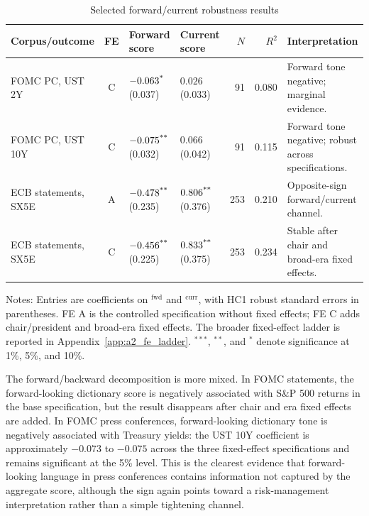 \begin{table}[H]
\centering
\caption{Selected forward/current robustness results}
\label{tab:fe_forward_current_selected_v31}
\begin{threeparttable}
\scriptsize
\setlength{\tabcolsep}{3pt}
\renewcommand{\arraystretch}{1.12}
\begin{tabularx}{\textwidth}{@{}p{2.55cm}c>{\raggedleft\arraybackslash}p{1.85cm}>{\raggedleft\arraybackslash}p{1.85cm}rrX@{}}
\toprule
Corpus/outcome & FE & Forward score & Current score & $N$ & $R^2$ & Interpretation \\
\midrule
FOMC PC, UST 2Y
  & C & $-0.063^{\text{*}}$ (0.037) & $0.026$ (0.033) & 91 & 0.080
  & Forward tone negative; marginal evidence. \\
FOMC PC, UST 10Y
  & C & $-0.075^{\text{**}}$ (0.032) & $0.066$ (0.042) & 91 & 0.115
  & Forward tone negative; robust across specifications. \\
ECB statements, SX5E
  & A & $-0.478^{\text{**}}$ (0.235) & $0.806^{\text{**}}$ (0.376) & 253 & 0.210
  & Opposite-sign forward/current channel. \\
ECB statements, SX5E
  & C & $-0.456^{\text{**}}$ (0.225) & $0.833^{\text{**}}$ (0.375) & 253 & 0.234
  & Stable after chair and broad-era fixed effects. \\
\bottomrule
\end{tabularx}
\begin{tablenotes}[flushleft]
\footnotesize
\item Notes: Entries are coefficients on \netscore{}$^{\text{fwd}}$ and
\netscore{}$^{\text{curr}}$, with HC1 robust standard errors in parentheses.
FE A is the controlled specification without fixed effects; FE C adds
chair/president and broad-era fixed effects. The broader fixed-effect ladder is
reported in Appendix~\ref{app:a2_fe_ladder}. $^{***}$, $^{**}$, and $^{*}$
denote significance at 1\%, 5\%, and 10\%.
\end{tablenotes}
\end{threeparttable}
\end{table}

The forward/backward decomposition is more mixed. In FOMC statements, the
forward-looking dictionary score is negatively associated with S\&P 500
returns in the base specification, but the result disappears after chair and
era fixed effects are added. In FOMC press conferences, forward-looking
dictionary tone is negatively associated with Treasury yields: the UST 10Y
coefficient is approximately $-0.073$ to $-0.075$ across the three
fixed-effect specifications and remains significant at the 5\% level. This is
the clearest evidence that forward-looking language in press conferences
contains information not captured by the aggregate score, although the sign
again points toward a risk-management interpretation rather than a simple
tightening channel.

